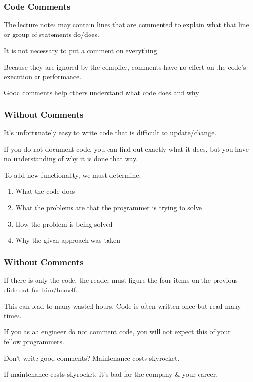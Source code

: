 \begin{frame}
\frametitle{Code Comments}

The lecture notes may contain lines that are commented to explain what that line or group of statements do/does.

It is not necessary to put a comment on everything.

Because they are ignored by the compiler, comments have no effect on the code's execution or performance.

Good comments help others understand what code does and why.

\end{frame}

\begin{frame}
\frametitle{Without Comments}

It's unfortunately easy to write code that is difficult to update/change.

If you do not document code, you can find out exactly what it does, but you have no understanding of why it is done that way.

To add new functionality, we must determine:

\begin{enumerate}
	\item What the code does
	\item What the problems are that the programmer is trying to solve
	\item How the problem is being solved
	\item Why the given approach was taken
\end{enumerate}

\end{frame}

\begin{frame}
\frametitle{Without Comments}

If there is only the code, the reader must figure the four items on the previous slide out for him/herself.

This can lead to many wasted hours. Code is often written once but read many times.

If you as an engineer do not comment code, you will not expect this of your fellow programmers.

Don't write good comments? Maintenance costs skyrocket.

If maintenance costs skyrocket, it's bad for the company \& your career.

\end{frame}

